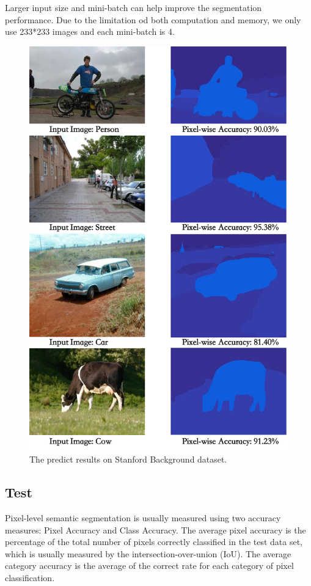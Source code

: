 \documentclass[10.5pt,compsoc]{TsT}
\theoremstyle{mystyle}
\begin{document}
{Larger input size and mini-batch can help improve the segmentation performance. Due to the limitation od both computation and memory, we only use 233*233 images and each mini-batch is 4.


\begin{figure}
\centering
\includegraphics[width=0.95\columnwidth]{fig4.png}
\caption{The predict results on Stanford Background dataset.}
\label{fig:stanford}
\end{figure} 

\subsection{Test}
\noindent
Pixel-level semantic segmentation is usually measured using two accuracy measures: Pixel Accuracy and Class Accuracy. The average pixel accuracy is the percentage of the total number of pixels correctly classified in the test data set, which is usually measured by the intersection-over-union (IoU). The average category accuracy is the average of the correct rate for each category of pixel classification.

}
\end{document}
